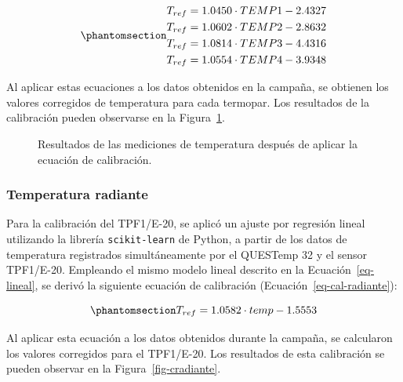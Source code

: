 \documentclass[
  letterpaper,
]{scrbook}
\begin{document}
\begin{equation}\phantomsection\label{eq-cal-termopares}{
\begin{align}
T_{ref} &= 1.0450 \cdot TEMP1 - 2.4327 \\
T_{ref} &= 1.0602 \cdot TEMP2 - 2.8632 \\
T_{ref} &= 1.0814 \cdot TEMP3 - 4.4316 \\
T_{ref} &= 1.0554 \cdot TEMP4 - 3.9348
\end{align}
}\end{equation}

Al aplicar estas ecuaciones a los datos obtenidos en la campaña, se
obtienen los valores corregidos de temperatura para cada termopar. Los
resultados de la calibración pueden observarse en la
Figura~\ref{fig-ctermopares}.

\begin{figure}


\caption{\label{fig-ctermopares}Resultados de las mediciones de
temperatura después de aplicar la ecuación de calibración.}

\end{figure}%

\subsubsection{Temperatura radiante}\label{temperatura-radiante-1}

Para la calibración del TPF1/E-20, se aplicó un ajuste por regresión
lineal utilizando la librería \texttt{scikit-learn} de Python, a partir
de los datos de temperatura registrados simultáneamente por el QUESTemp
32 y el sensor TPF1/E-20. Empleando el mismo modelo lineal descrito en
la Ecuación~\ref{eq-lineal}, se derivó la siguiente ecuación de
calibración (Ecuación~\ref{eq-cal-radiante}):

\begin{equation}\phantomsection\label{eq-cal-radiante}{
T_{ref} = 1.0582 \cdot temp - 1.5553
}\end{equation}

Al aplicar esta ecuación a los datos obtenidos durante la campaña, se
calcularon los valores corregidos para el TPF1/E-20. Los resultados de
esta calibración se pueden observar en la Figura~\ref{fig-cradiante}.
\end{document}
